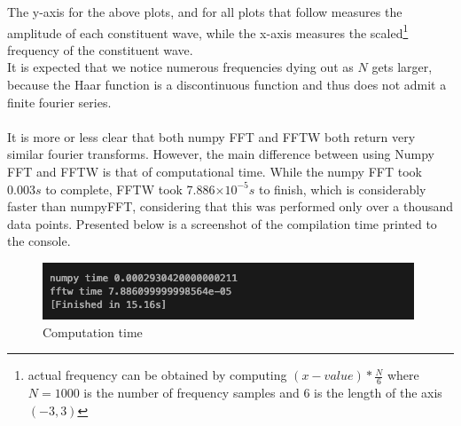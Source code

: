 \documentclass[12pt]{article}
\begin{document}
The y-axis for the above plots, and for all plots that follow measures the amplitude of each constituent wave, while the x-axis measures the scaled\footnote{actual frequency can be obtained by computing $(x-value)*\frac{N}{6}$ where $N=1000$ is the number of frequency samples and $6$ is the length of the axis $(-3,3)$} frequency of the constituent wave. \\
\indent It is expected that we notice numerous frequencies dying out as $N$ gets larger, because the Haar function is a discontinuous function and thus does not admit a finite fourier series. \\\\

It is more or less clear that both numpy FFT and FFTW both return very similar fourier transforms.  However, the main difference between using Numpy FFT and FFTW is that of computational time. While the numpy FFT took $0.003s$ to complete, FFTW took 7.886$\times10^{-5}s$ to finish, which is considerably faster than numpyFFT, considering that this was performed only over a thousand data points. Presented below is a screenshot of the compilation time printed to the console. 
\begin{figure}[h]
	\centering
	\includegraphics[scale=0.40]{timediff.png}
	\caption{Computation time}
\end{figure}
\end{document}
